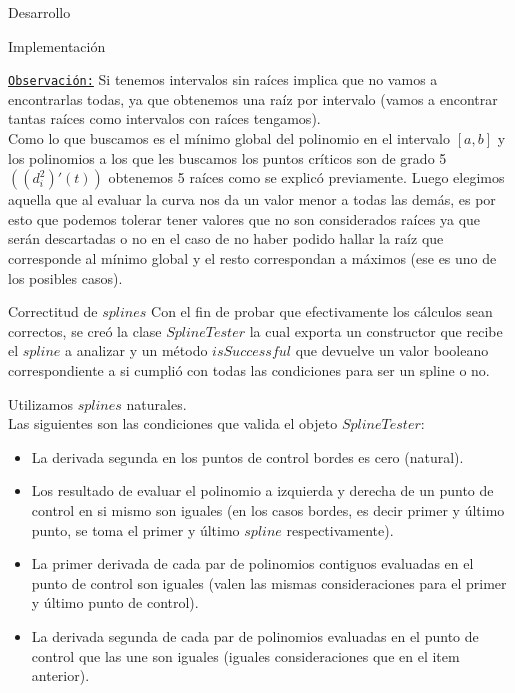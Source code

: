 \begin{section}{Desarrollo}
\begin{subsection}{Implementación}
\begin{itemize}
				\underline{\texttt{Observación:}} Si tenemos intervalos sin raíces implica que no vamos a encontrarlas todas, ya que obtenemos una raíz por intervalo (vamos a encontrar tantas raíces como intervalos con raíces tengamos).\\
				
				Como lo que buscamos es el mínimo global del polinomio en el intervalo $[a,b]$ y los polinomios a los que les buscamos los puntos críticos son de grado 5 $((d_i^2)'(t))$ obtenemos 5 raíces como se explicó previamente. Luego elegimos aquella que al evaluar la curva nos da un valor menor a todas las demás, es por esto que podemos tolerar tener valores que no son considerados raíces ya que serán descartadas o no en el caso de no haber podido hallar la raíz que corresponde al mínimo global y el resto correspondan a máximos (ese es uno de los posibles casos).
		\end{itemize}
	\end{subsection}
	\begin{subsection}{Correctitud de $splines$}
		Con el fin de probar que efectivamente los cálculos sean correctos, se creó la clase $SplineTester$ la cual exporta un constructor que recibe el $spline$ a analizar y un método $isSuccessful$ que devuelve un valor booleano correspondiente a si cumplió con todas las condiciones para ser un spline o no.
		
		Utilizamos $splines$ naturales.\\
		
		Las siguientes son las condiciones que valida el objeto $SplineTester$:
		
		\begin{itemize}
			\item La derivada segunda en los puntos de control bordes es cero (natural).
			\item Los resultado de evaluar el polinomio a izquierda y derecha de un punto de control en si mismo son iguales (en los casos bordes, es decir primer y último punto, se toma el primer y último $spline$ respectivamente).
			\item La primer derivada de cada par de polinomios contiguos evaluadas en el punto de control son iguales (valen las mismas consideraciones para el primer y último punto de control).
			\item La derivada segunda de cada par de polinomios evaluadas en el punto de control que las une son iguales (iguales consideraciones que en el item anterior).
		\end{itemize}
		
	
	\end{subsection}
\end{section}
